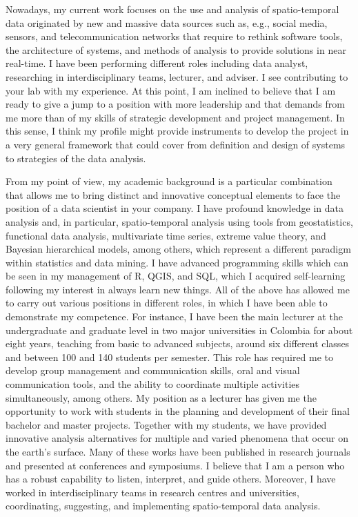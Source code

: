 \documentclass[11pt, a4paper]{awesome-cv}
\begin{document}
\begin{cvletter}
Nowadays, my current work focuses on the use and analysis of spatio-temporal data originated by new and massive data sources such as, e.g., social media, sensors, and telecommunication networks that require to rethink software tools, the architecture of systems, and methods of analysis to provide solutions in near real-time. I have been performing different roles including data analyst, researching in interdisciplinary teams, lecturer, and adviser. I see contributing to your lab with my experience. At this point, I am inclined to believe that I am ready to give a jump to a position with more leadership and that demands from me more than of my skills of strategic development and project management. In this sense, I think my profile might provide instruments to develop the project in a very general framework that could cover from definition and design of systems to strategies of the data analysis.\par
From my point of view, my academic background is a particular combination that allows me to bring distinct and innovative conceptual elements to face the position of a data scientist in your company. I have profound knowledge in data analysis and, in particular, spatio-temporal analysis using tools from geostatistics, functional data analysis, multivariate time series, extreme value theory, and Bayesian hierarchical models, among others, which represent a different paradigm within statistics and data mining. I have advanced programming skills which can be seen in my management of R, QGIS, and SQL, which I acquired self-learning following my interest in always learn new things. All of the above has allowed me to carry out various positions in different roles, in which I have been able to demonstrate my competence. For instance, I have been the main lecturer at the undergraduate and graduate level in two major universities in Colombia for about eight years, teaching from basic to advanced subjects, around six different classes and between 100 and 140 students per semester. This role has required me to develop group management and communication skills, oral and visual communication tools, and the ability to coordinate multiple activities simultaneously, among others. My position as a lecturer has given me the opportunity to work with students in the planning and development of their final bachelor and master projects. Together with my students, we have provided innovative analysis alternatives for multiple and varied phenomena that occur on the earth’s surface. Many of these works have been published in research journals and presented at conferences and symposiums. I believe that I am a person who has a robust capability to listen, interpret, and guide others. Moreover, I have worked in interdisciplinary teams in research centres and universities, coordinating, suggesting, and implementing spatio-temporal data analysis.\par

\end{cvletter}
\end{document}
